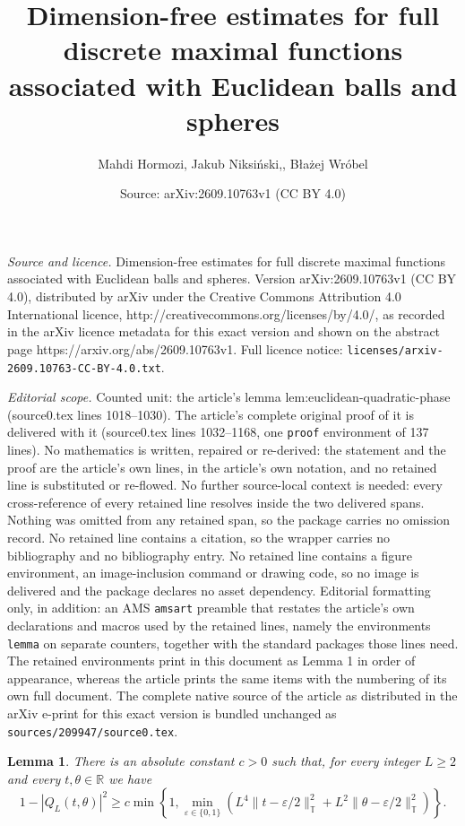 \documentclass[10pt,a4paper]{amsart}
\title{Dimension-free estimates for full discrete maximal functions associated with Euclidean balls and spheres}
\author{Mahdi Hormozi, Jakub Niksi\'nski,, B{\l}a\.zej Wr\'obel}
\date{Source: arXiv:2609.10763v1 (CC BY 4.0)}
\newtheorem{lemma}{Lemma}
\newcommand{\R}{\mathbb R}
\newcommand{\T}{\mathbb T}
\begin{document}
\maketitle

\noindent\emph{Source and licence.} Dimension-free estimates for full discrete maximal functions associated with Euclidean balls and spheres. Version arXiv:2609.10763v1 (CC BY 4.0), distributed by arXiv under the Creative Commons Attribution 4.0 International licence, http://creativecommons.org/licenses/by/4.0/, as recorded in the arXiv licence metadata for this exact version and shown on the abstract page https://arxiv.org/abs/2609.10763v1. Full licence notice: \texttt{licenses/arxiv-2609.10763-CC-BY-4.0.txt}.\par\smallskip

\noindent\textit{Editorial scope.} Counted unit: the article's lemma lem:euclidean-quadratic-phase (source0.tex lines 1018--1030). The article's complete original proof of it is delivered with it (source0.tex lines 1032--1168, one \texttt{proof} environment of 137 lines). No mathematics is written, repaired or re-derived: the statement and the proof are the article's own lines, in the article's own notation, and no retained line is substituted or re-flowed.  No further source-local context is needed: every cross-reference of every retained line resolves inside the two delivered spans.  Nothing was omitted from any retained span, so the package carries no omission record.  No retained line contains a citation, so the wrapper carries no bibliography and no bibliography entry.  No retained line contains a figure environment, an image-inclusion command or drawing code, so no image is delivered and the package declares no asset dependency.  Editorial formatting only, in addition: an AMS \texttt{amsart} preamble that restates the article's own declarations and macros used by the retained lines, namely the environments \texttt{lemma} on separate counters, together with the standard packages those lines need.  The retained environments print in this document as Lemma 1 in order of appearance, whereas the article prints the same items with the numbering of its own full document.  The complete native source of the article as distributed in the arXiv e-print for this exact version is bundled unchanged as \texttt{sources/209947/source0.tex}.
\begin{lemma}\label{lem:euclidean-quadratic-phase}
There is an absolute constant $c>0$ such that, for every integer $L\geq2$ and every
$t,\theta\in\R$ we have
\begin{equation}\label{eq:euclidean-finite-rigidity}
 1-|Q_L(t,\theta)|^2
 \geq c\min\left\{1,
 \min_{\varepsilon\in\{0,1\}}
 \left(
 L^4\|t-\varepsilon/2\|_{\T}^2
 +L^2\|\theta-\varepsilon/2\|_{\T}^2
 \right)\right\}.
\end{equation}
\end{lemma}
\end{document}
